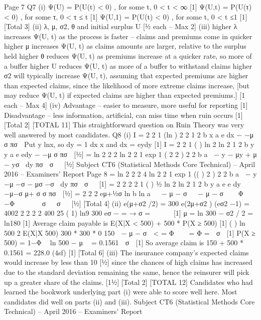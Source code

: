 Page 7
Q7 (i) Ψ(U) = P(U(t) < 0) , for some t, 0 < t < ∞ [1]
Ψ(U,t) = P(U(τ) < 0) , for some τ, 0 < τ ≤ t [1]
Ψ(U,1) = P(U(t) < 0) , for some t, 0 < t ≤1 [1]
[Total 3]
(ii) λ, μ, σ2, θ and initial surplus U [½ each – Max 2]
(iii) higher λ increases Ψ(U, t) as the process is faster – claims and premiums
come in quicker
higher μ increases Ψ(U, t) as claims amounts are larger, relative to the surplus
held
higher θ reduces Ψ(U, t) as premiums increase at a quicker rate, so more of a
buffer
higher U reduces Ψ(U, t) as more of a buffer to withstand claims
higher σ2 will typically increase Ψ(U, t), assuming that expected premiums
are higher than expected claims, since the likelihood of more
extreme claims increase, [but may reduce Ψ(U, t) if expected claims
                          are higher than expected premiums.]
[1 each – Max 4]
(iv) Advantage – easier to measure, more useful for reporting [1]
Disadvantage – less information, artificial, can miss time when ruin occurs [1]
[Total 2]
[TOTAL 11]
This straightforward question on Ruin Theory was very well answered by
most candidates.
Q8 (i) I =
  2
2
1 (ln )
2
2
1
2
b x
a
e dx
− −μ
σ
πσ

Put y lnx, so dy = 1 dx
x
and dx = eydy [1]
I =
  2
2
1 ( ) ln 2
ln 2
1
2
b y y
a
e edy
− −μ
σ
πσ
 [½]
=
  ln 2 2 2
ln 2 2
1 exp 1 ( 2 2 )
2 2
b
a
− y − μy + μ − yσ dy
πσ  σ 
 [½]
Subject CT6 (Statistical Methods Core Technical) – April 2016 – Examiners’ Report
Page 8
=
  ln 2 2 2 4
ln 2 2
1 exp 1 (( ) 2 )
2 2
b
a
− y −μ −σ − μσ −σ dy
πσ  σ 
 [1]
=
  2 2
2 2
1 ( ) ½ ln 2
ln 2
1
2
b y
a
e e dy
−μ−σ
μ+ σ σ
πσ  [½]
= 2 2 2
eμ+½σ ln b ln a   − μ − σ   − μ − σ   Φ  −Φ     σ   σ  
[½]
[Total 4]
(ii)
e(μ+σ2 /2) = 300
e(2μ+σ2 ) (eσ2 −1) = 4002
2 2
2
2
400 25 ( 1) ln9 300
eσ − = → σ =  
 
[1]
μ = ln 300 − σ2 / 2 = ln180 [1]
Average claim payable is
E(X|X < 500) + 500 * P(X ≥ 500) [1]
( )
ln 500 2 E(X|X 500) 300 * 300 * 0 150
 − μ − σ  < = Φ   = Φ =  σ 
[1]
P(X ≥ 500) = 1−Φ  ln 500 − μ  = 0.1561  σ 
[1]
So average claim is 150 + 500 * 0.1561 = 228.0 (4sf) [1]
[Total 6]
(iii) The insurance company’s expected claims would increase by less than 10%
[½]
since the chances of high claims has increased due to the standard deviation
remaining the same, hence the reinsurer will pick up a greater share of the
claims. [1½]
[Total 2]
[TOTAL 12]
Candidates who had learned the bookwork underlying part (i) were able to
score well here. Most candidates did well on parts (ii) and (iii).
Subject CT6 (Statistical Methods Core Technical) – April 2016 – Examiners’ Report
